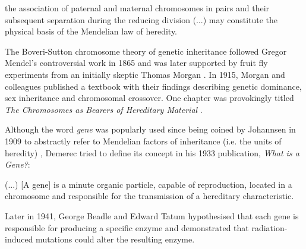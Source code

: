 \begin{displayquote}
the association of paternal and maternal chromosomes in pairs and their subsequent separation during the reducing division (...) may constitute the physical basis of the Mendelian law of heredity.
\end{displayquote}

The Boveri-Sutton chromosome theory of genetic inheritance followed Gregor Mendel's controversial \cite{} work in 1865 \cite{sutton:1902tx} and was later supported by fruit fly experiments from an initially skeptic \cite{} Thomas Morgan \cite{morgan:1915tw}. In 1915, Morgan and colleagues published a textbook with their findings describing genetic dominance, sex inheritance and chromosomal crossover. One chapter was provokingly titled \emph{The Chromosomes as Bearers of Hereditary Material} \cite{morgan:1915tw}.




Although the word \emph{gene} was popularly used since being coined by Johannsen in 1909 to abstractly refer to Mendelian factors of inheritance (i.e. the units of heredity) \cite{}, Demerec tried to define its concept in his 1933 publication, \emph{What is a Gene?}: %

\begin{displayquote}[\cite{}]
(...) [A gene] is a minute organic particle, capable of reproduction, located in a chromosome and responsible for the transmission of a hereditary characteristic.
\end{displayquote}

Later in 1941, George Beadle and Edward Tatum hypothesised that each gene is responsible for producing a specific enzyme and demonstrated that radiation-induced mutations could alter the resulting enzyme.

